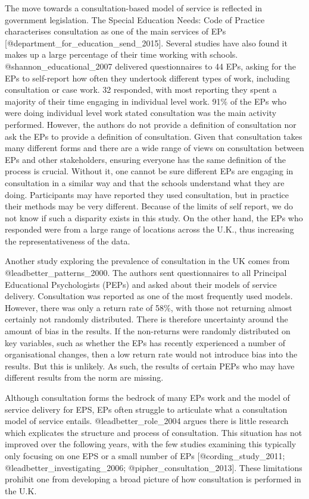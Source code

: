 \documentclass[
]{article}
\begin{document}
The move towards a consultation-based model of service is reflected in
government legislation. The Special Education Needs: Code of Practice
characterises consultation as one of the main services of EPs
{[}@department\_for\_education\_send\_2015{]}. Several studies have also
found it makes up a large percentage of their time working with schools.
@shannon\_educational\_2007 delivered questionnaires to 44 EPs, asking
for the EPs to self-report how often they undertook different types of
work, including consultation or case work. 32 responded, with most
reporting they spent a majority of their time engaging in individual
level work. 91\% of the EPs who were doing individual level work stated
consultation was the main activity performed. However, the authors do
not provide a definition of consultation nor ask the EPs to provide a
definition of consultation. Given that consultation takes many different
forms and there are a wide range of views on consultation between EPs
and other stakeholders, ensuring everyone has the same definition of the
process is crucial. Without it, one cannot be sure different EPs are
engaging in consultation in a similar way and that the schools
understand what they are doing. Participants may have reported they used
consultation, but in practice their methods may be very different.
Because of the limits of self report, we do not know if such a disparity
exists in this study. On the other hand, the EPs who responded were from
a large range of locations across the U.K., thus increasing the
representativeness of the data.

Another study exploring the prevalence of consultation in the UK comes
from @leadbetter\_patterns\_2000. The authors sent questionnaires to all
Principal Educational Psychologists (PEPs) and asked about their models
of service delivery. Consultation was reported as one of the most
frequently used models. However, there was only a return rate of 58\%,
with those not returning almost certainly not randomly distributed.
There is therefore uncertainty around the amount of bias in the results.
If the non-returns were randomly distributed on key variables, such as
whether the EPs has recently experienced a number of organisational
changes, then a low return rate would not introduce bias into the
results. But this is unlikely. As such, the results of certain PEPs who
may have different results from the norm are missing.

Although consultation forms the bedrock of many EPs work and the model
of service delivery for EPS, EPs often struggle to articulate what a
consultation model of service entails. @leadbetter\_role\_2004 argues
there is little research which explicates the structure and process of
consultation. This situation has not improved over the following years,
with the few studies examining this typically only focusing on one EPS
or a small number of EPs {[}@cording\_study\_2011;
@leadbetter\_investigating\_2006; @pipher\_consultation\_2013{]}. These
limitations prohibit one from developing a broad picture of how
consultation is performed in the U.K.
\end{document}
